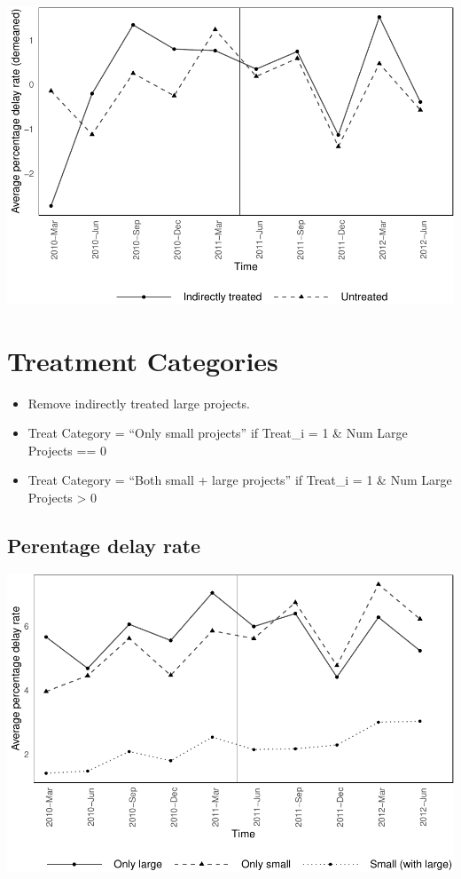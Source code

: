 \documentclass[
]{article}
\providecommand{\tightlist}{%
  \setlength{\itemsep}{0pt}\setlength{\parskip}{0pt}}
\begin{document}
\includegraphics{parallel_trends_indirect_treat_files/figure-latex/demeaned_delay_plot-1.pdf}

\hypertarget{treatment-categories}{%
\section{Treatment Categories}\label{treatment-categories}}

\begin{itemize}
\tightlist
\item
  Remove indirectly treated large projects.
\item
  Treat Category = ``Only small projects'' if Treat\_i = 1 \& Num Large
  Projects == 0
\item
  Treat Category = ``Both small + large projects'' if Treat\_i = 1 \&
  Num Large Projects \textgreater{} 0
\end{itemize}

\hypertarget{perentage-delay-rate}{%
\subsection{Perentage delay rate}\label{perentage-delay-rate}}

\includegraphics{parallel_trends_indirect_treat_files/figure-latex/delay_plot_treat_groups-1.pdf}
\end{document}
